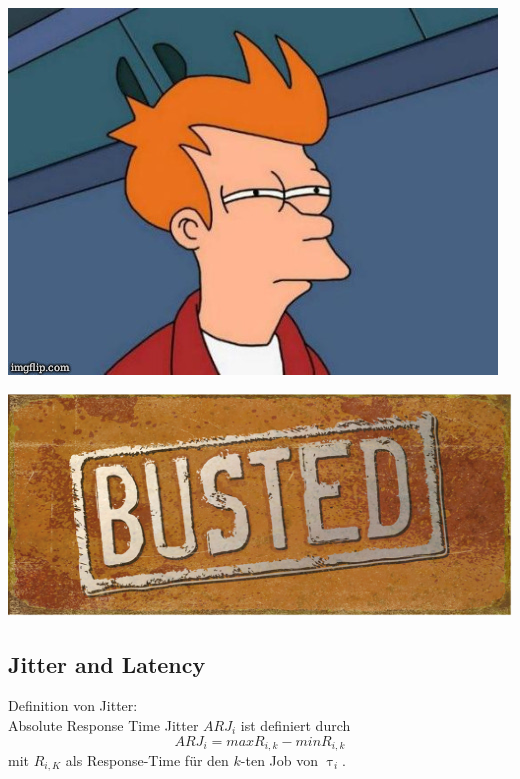 \begin{frame}{\subsecname}
	\begin{center}
			\includegraphics[scale=.4]{graphics/memes/fry.jpg}
	\end{center}
\end{frame}

\begin{frame}{\subsecname}
	\begin{center}
			\includegraphics[scale=1]{graphics/memes/busted.jpg}
	\end{center}
\end{frame}



\subsection{Jitter and Latency}\label{JitterandLatency}

\begin{frame}{\subsecname}
	Definition von Jitter:\\
	Absolute Response Time Jitter $ARJ_i$ ist definiert durch
	\begin{equation}
		ARJ_i=max R_{i,k}-min R_{i,k}
	\end{equation} mit
	$R_{i,K}$ als Response-Time für den $k$-ten Job von $\uptau_i$.
\end{frame}

